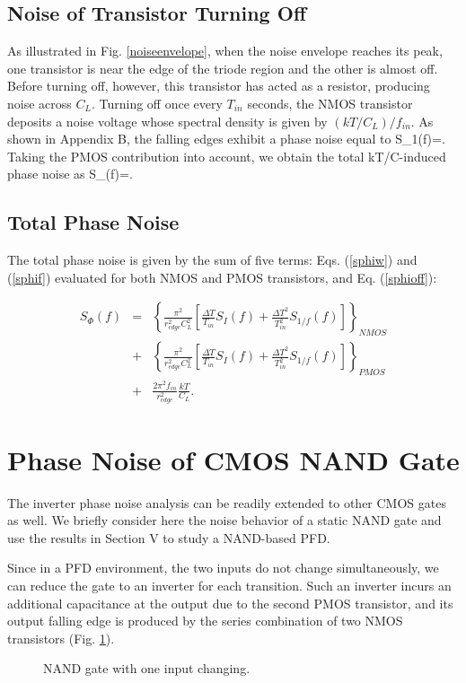 \subsection{Noise of Transistor Turning Off}
As illustrated in Fig. \ref{noiseenvelope}, when the noise envelope reaches its peak, one transistor is near the edge of the triode region and the other is almost
off. Before turning off, however, this transistor has acted as a resistor, producing noise across $C_L$. {Turning off once every $T_{in}$ seconds,
the NMOS transistor deposits a noise voltage whose spectral density is given by $(kT/C_L)/f_{in}$. As shown in Appendix B, the falling edges
exhibit a phase noise equal to 
\beq
S_{1}(f)=.
\label{sphi1}
\eeq
Taking the PMOS contribution into account, we obtain the total kT/C-induced phase noise as
\beq
S_{\Phi}(f)=.
\label{sphioff}
\eeq
}

\subsection{Total Phase Noise}
The total phase noise is given by the sum of five terms: Eqs. (\ref{sphiw}) and (\ref{sphif}) evaluated for both NMOS and PMOS transistors, and
Eq. (\ref{sphioff}):

\begin{eqnarray}
S_{\Phi}(f)&=& \left\{\frac{\pi^2}{r_{edge}^2 C_L^2}[\frac{{\Delta T}}{T_{in}}S_{I}(f)+\frac{{\Delta T}^2}{T_{in}^2}S_{1/f}(f)]\right\}_{NMOS} \nonumber  \\ 
&+&\left\{\frac{\pi^2}{r_{edge}^2 C_L^2}[\frac{{\Delta T}}{T_{in}}S_{I}(f)+\frac{{\Delta T}^2}{T_{in}^2}S_{1/f}(f)]\right\}_{PMOS} \nonumber  \\ 
&+&\frac{2 \pi^2 f_{in}}{r_{edge}^2}\frac{kT}{C_L}.
\label{sphitot}
\end{eqnarray}




\section{Phase Noise of CMOS NAND Gate}
The inverter phase noise analysis can be readily extended to other CMOS gates as well. We briefly consider here the noise behavior of a static NAND
gate and use the results in Section V to study a NAND-based PFD.

Since in a PFD environment, the two inputs do not change simultaneously, we can reduce the gate to an inverter for each transition. Such an inverter
incurs an additional capacitance at the output due to the second PMOS transistor, and its output falling edge is produced by the series combination
of two NMOS transistors (Fig. \ref{nand}).
\begin{figure}[htb]
\vspace{1.3in}
\caption{NAND gate with one input changing.}
\label{nand}
\end{figure}

